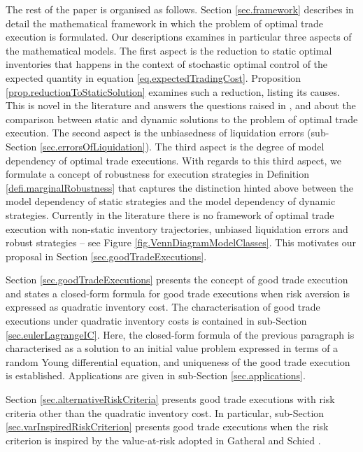\documentclass[10pt,a4paper]{article}
\begin{document}
	\nocite{CJ19alg}
	\nocite{HJN19mea}
	\nocite{CDJ17alg}
	\nocite{CJ19tra}
	
	
	The rest of the paper is organised as follows. Section \ref{sec.framework} describes in detail the mathematical framework in which the problem of optimal trade execution is formulated. Our descriptions examines in particular three aspects of the mathematical models. The first aspect is the reduction to static optimal inventories that happens in the context of stochastic optimal control of the expected quantity in equation \eqref{eq.expectedTradingCost}.  Proposition \ref{prop.reductionToStaticSolution} examines such a reduction, listing its causes. This is novel in the literature and answers the questions raised in \cite{BD14opt}, \cite{BP18sta} and \cite{BBDN18sta}  about the comparison between static and dynamic solutions to the problem of optimal trade execution.  The second aspect is  the unbiasedness of liquidation errors (sub-Section \ref{sec.errorsOfLiquidation}). The third aspect is the degree of model dependency of optimal trade executions. With regards to this third aspect, we formulate a concept of robustness for execution strategies in Definition \ref{defi.marginalRobustness} that captures the distinction hinted above between the model dependency of static strategies and the model dependency of dynamic strategies.
	Currently in the literature there is no framework of optimal trade execution with non-static inventory trajectories, unbiased liquidation errors and robust strategies -- see Figure \ref{fig.VennDiagramModelClasses}. This motivates our proposal in Section \ref{sec.goodTradeExecutions}.  
	
	Section \ref{sec.goodTradeExecutions} presents the concept of good trade execution and states a closed-form formula for good trade executions when risk aversion is expressed as quadratic inventory cost. The characterisation of good trade executions under quadratic inventory costs is contained in sub-Section \ref{sec.eulerLagrangeIC}. Here, the closed-form formula of the previous  paragraph is characterised as a solution to an initial value problem expressed in terms of a   random Young differential equation, and uniqueness of the good trade execution  is established. Applications are given in sub-Section \ref{sec.applications}.
	
	Section \ref{sec.alternativeRiskCriteria} presents good trade executions with risk criteria other than the quadratic inventory cost. In particular, sub-Section \ref{sec.varInspiredRiskCriterion} presents good trade executions when the risk criterion is inspired by the value-at-risk adopted in Gatheral and Schied \cite{GS11opt}.    
	
\end{document}
